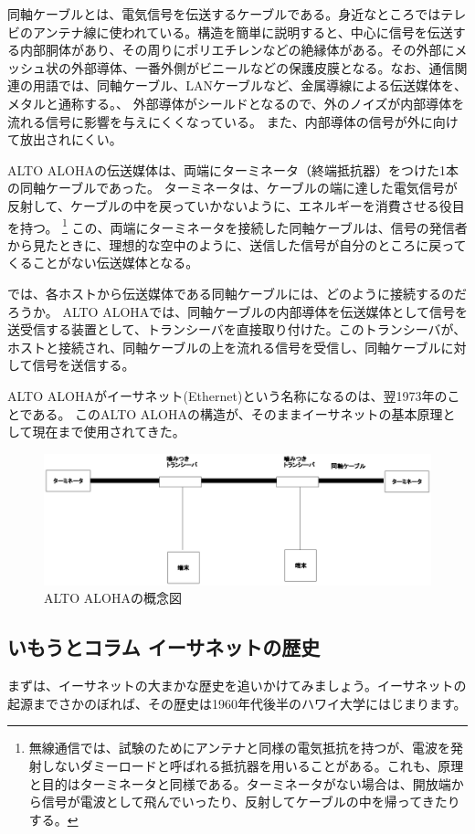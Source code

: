 同軸ケーブルとは、電気信号を伝送するケーブルである。身近なところではテレビのアンテナ線に使われている。構造を簡単に説明すると、中心に信号を伝送する内部胴体があり、その周りにポリエチレンなどの絶縁体がある。その外部にメッシュ状の外部導体、一番外側がビニールなどの保護皮膜となる。なお、通信関連の用語では、同軸ケーブル、LANケーブルなど、金属導線による伝送媒体を、メタルと通称する。、
外部導体がシールドとなるので、外のノイズが内部導体を流れる信号に影響を与えにくくなっている。
また、内部導体の信号が外に向けて放出されにくい。

ALTO ALOHAの伝送媒体は、両端にターミネータ（終端抵抗器）をつけた1本の同軸ケーブルであった。
ターミネータは、ケーブルの端に達した電気信号が反射して、ケーブルの中を戻っていかないように、エネルギーを消費させる役目を持つ。
\footnote{無線通信では、試験のためにアンテナと同様の電気抵抗を持つが、電波を発射しないダミーロードと呼ばれる抵抗器を用いることがある。これも、原理と目的はターミネータと同様である。ターミネータがない場合は、開放端から信号が電波として飛んでいったり、反射してケーブルの中を帰ってきたりする。}
この、両端にターミネータを接続した同軸ケーブルは、信号の発信者から見たときに、理想的な空中のように、送信した信号が自分のところに戻ってくることがない伝送媒体となる。

では、各ホストから伝送媒体である同軸ケーブルには、どのように接続するのだろうか。
ALTO ALOHAでは、同軸ケーブルの内部導体を伝送媒体として信号を送受信する装置として、トランシーバを直接取り付けた。このトランシーバが、ホストと接続され、同軸ケーブルの上を流れる信号を受信し、同軸ケーブルに対して信号を送信する。

ALTO ALOHAがイーサネット(Ethernet)という名称になるのは、翌1973年のことである。
このALTO ALOHAの構造が、そのままイーサネットの基本原理として現在まで使用されてきた。

\begin{figure}[htbp]
	\includegraphics[width=12cm,clip]{draw/altoaloha.eps}
	\caption{ALTO ALOHAの概念図}
	\label{fig:altoaloha}
\end{figure}

\subsection*{いもうとコラム イーサネットの歴史}
まずは、イーサネットの大まかな歴史を追いかけてみましょう。イーサネットの起源までさかのぼれば、その歴史は1960年代後半のハワイ大学にはじまります。

